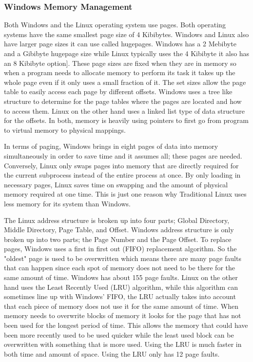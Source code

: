 \documentclass[draftclsnofoot, onecolumn, compsoc, 10pt]{IEEEtran}
\begin{document}
\subsubsection{Windows Memory Management}
Both Windows and the Linux operating system use pages. Both operating systems have the same smallest page size of 4 Kibibytes\cite{windowsbookpt2}. Windows and Linux also have larger page sizes it can use called hugepages. Windows has a 2 Mebibyte and a Gibibyte hugepage size while Linux typically uses the 4 Kibibyte it also has an 8 Kibibyte option]\cite{all_answers_ltd_2015}. These page sizes are fixed when they are in memory so when a program needs to allocate memory to perform its task it takes up the whole page even if it only uses a small fraction of it. The set sizes allow the page table to easily access each page by different offsets. Windows uses a tree like structure to determine for the page tables where the pages are located and how to access them. Linux on the other hand uses a linked list type of data structure for the offsets. In both, memory is heavily using pointers to first go from program to virtual memory to physical mappings. \cite{all_answers_ltd_2015}

In terms of paging, Windows brings in eight pages of data into memory simultaneously in order to save time and it assumes all; these pages are needed. Conversely, Linux only swaps pages into memory that are directly required for the current subprocess instead of the entire process at once\cite{all_answers_ltd_2015}. By only loading in necessary pages, Linux saves time on swapping and the amount of physical memory required at one time. This is just one reason why Traditional Linux uses less memory for its system than Windows. 

The Linux address structure is broken up into four parts; Global Directory, Middle Directory, Page Table, and Offset. Windows address structure is only broken up into two parts; the Page Number and the Page Offset. To replace pages, Windows uses a first in first out (FIFO) replacement algorithm. So the "oldest" page is used to be overwritten which means there are many page faults that can happen since each spot of memory does not need to be there for the same amount of time. Windows has about 155 page faults. Linux on the other hand uses the Least Recently Used (LRU) algorithm, while this algorithm can sometimes line up with Windows' FIFO, the LRU actually takes into account that each piece of memory does not use it for the same amount of time\cite{all_answers_ltd_2015}. When memory needs to overwrite blocks of memory it looks for the page that has not been used for the longest period of time. This allows the memory that could have been more recently used to be used quicker while the least used block can be overwritten with something that is more used. Using the LRU is much faster in both time and amount of space. Using the LRU only has 12 page faults.\cite{dube_1998}
\end{document}
